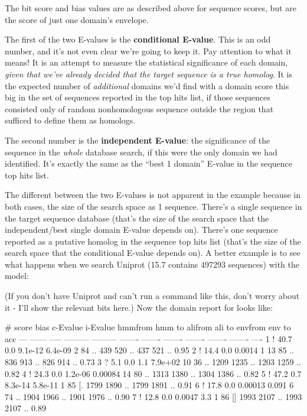 The bit score and bias values are as described above for sequence
scores, but are the score of just one domain's envelope. 

The first of the two E-values is the \textbf{conditional
E-value}. This is an odd number, and it's not even clear we're going
to keep it. Pay attention to what it means! It is an attempt to
measure the statistical significance of each domain, \emph{given that
we've already decided that the target sequence is a true homolog}.  It
is the expected number of \emph{additional} domains we'd find with a
domain score this big in the set of sequences reported in the top hits
list, if those sequences consisted only of random nonhomologous
sequence outside the region that sufficed to define them as homologs. 

The second number is the \textbf{independent E-value}: the
significance of the sequence in the \emph{whole} database search, if
this were the only domain we had identified. It's exactly the same as
the ``best 1 domain'' E-value in the sequence top hits list.

The different between the two E-values is not apparent in the
 example because in both cases, the size of the
search space as 1 sequence. There's a single sequence in the target
sequence database (that's the size of the search space that the
independent/best single domain E-value depends on). There's one
sequence reported as a putative homolog in the sequence top hits list
(that's the size of the search space that the conditional E-value
depends on). A better example is to see what happens when we search
Uniprot (15.7 contains 497293 sequences) with the  model:


(If you don't have Uniprot and can't run a command like this, don't
worry about it - I'll show the relevant bits here.) Now the domain
report for  looks like:

\begin{sreoutput}
   #    score  bias  c-Evalue  i-Evalue hmmfrom  hmm to    alifrom  ali to    envfrom  env to     acc
 ---   ------ ----- --------- --------- ------- -------    ------- -------    ------- -------    ----
   1 !   40.7   0.0   9.1e-12   6.4e-09       2      84 ..     439     520 ..     437     521 .. 0.95
   2 !   14.4   0.0    0.0014         1      13      85 ..     836     913 ..     826     914 .. 0.73
   3 ?    5.1   0.0       1.1   7.9e+02      10      36 ..    1209    1235 ..    1203    1259 .. 0.82
   4 !   24.3   0.0   1.2e-06   0.00084      14      80 ..    1313    1380 ..    1304    1386 .. 0.82
   5 !   47.2   0.7   8.3e-14   5.8e-11       1      85 [.    1799    1890 ..    1799    1891 .. 0.91
   6 !   17.8   0.0   0.00013     0.091       6      74 ..    1904    1966 ..    1901    1976 .. 0.90
   7 !   12.8   0.0    0.0047       3.3       1      86 []    1993    2107 ..    1993    2107 .. 0.89
\end{sreoutput}

